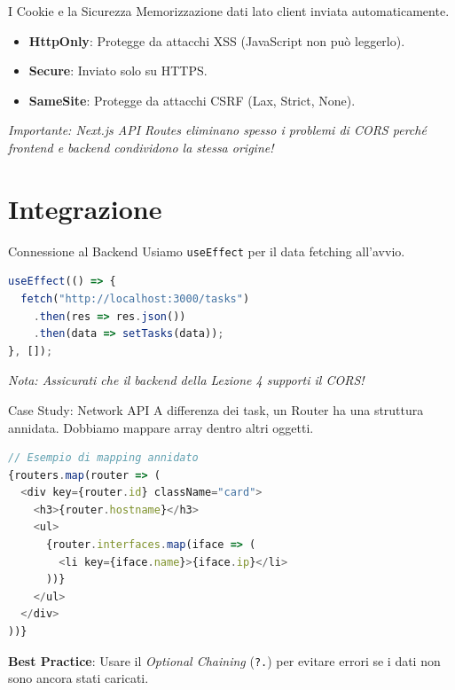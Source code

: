 \documentclass[10pt]{beamer}
\begin{document}
\begin{frame}{I Cookie e la Sicurezza}
    Memorizzazione dati lato client inviata automaticamente.
    \begin{itemize}
        \item \textbf{HttpOnly}: Protegge da attacchi XSS (JavaScript non può leggerlo).
        \item \textbf{Secure}: Inviato solo su HTTPS.
        \item \textbf{SameSite}: Protegge da attacchi CSRF (Lax, Strict, None).
    \end{itemize}
    \vspace{0.3cm}
    \textit{Importante: Next.js API Routes eliminano spesso i problemi di CORS perché frontend e backend condividono la stessa origine!}
\end{frame}

\section{Integrazione}
\begin{frame}[fragile]{Connessione al Backend}
    Usiamo \texttt{useEffect} per il data fetching all'avvio.
    \begin{lstlisting}[language=javascript]
useEffect(() => {
  fetch("http://localhost:3000/tasks")
    .then(res => res.json())
    .then(data => setTasks(data));
}, []);
\end{lstlisting}
    \textit{Nota: Assicurati che il backend della Lezione 4 supporti il CORS!}
\end{frame}

\begin{frame}[fragile]{Case Study: Network API}
    A differenza dei task, un Router ha una struttura annidata. Dobbiamo mappare array dentro altri oggetti.
    \begin{lstlisting}[language=javascript]
// Esempio di mapping annidato
{routers.map(router => (
  <div key={router.id} className="card">
    <h3>{router.hostname}</h3>
    <ul>
      {router.interfaces.map(iface => (
        <li key={iface.name}>{iface.ip}</li>
      ))}
    </ul>
  </div>
))}
    \end{lstlisting}
    \textbf{Best Practice}: Usare il \textit{Optional Chaining} (\texttt{?.}) per evitare errori se i dati non sono ancora stati caricati.
\end{frame}
\end{document}
